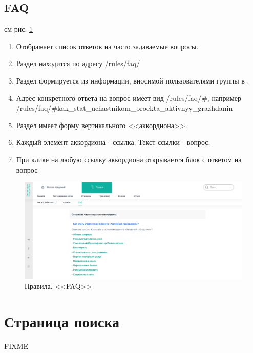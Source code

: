         \subsection{FAQ}
            \label{sec:page_faq}
            
            см рис. \ref{fig:page_faq}

            \begin{enumerate}
                \item Отображает список ответов на часто задаваемые вопросы.
                \item Раздел находится по адресу /rules/faq/
                \item Раздел формируется из информации, вносимой пользователями группы  в .
                \item Адрес конкретного ответа на вопрос имеет вид /rules/faq/\#<транслит вопроса>, например /rules/faq/\#kak\_stat\_uchastnikom\_proekta\_aktivnyy\_grazhdanin
                \item Раздел имеет форму вертикального <<аккордиона>>. 
                \item Каждый элемент аккордиона - ссылка. Текст ссылки - вопрос.
                \item При клике на любую ссылку аккордиона открывается блок с ответом на вопрос
            \end{enumerate}
            

        \begin{figure}
            \includegraphics[width=170mm]{02_noauth_funcs/figures/11.eps}
            \caption{Правила. <<FAQ>>}
            \label{fig:page_faq}
        \end{figure} 
            
            
    \section{Страница поиска}
        \label{search_page}
        
        FIXME

